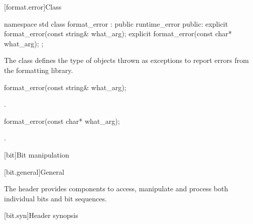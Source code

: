 [format.error]{Class }

%
\begin{codeblock}
namespace std {
  class format_error : public runtime_error {
  public:
    explicit format_error(const string& what_arg);
    explicit format_error(const char* what_arg);
  };
}
\end{codeblock}

\pnum
The class  defines the type of objects thrown as
exceptions to report errors from the formatting library.

%
\begin{itemdecl}
format_error(const string& what_arg);
\end{itemdecl}

\begin{itemdescr}
\pnum
\ensures
{}.

%
\end{itemdescr}
\begin{itemdecl}
format_error(const char* what_arg);
\end{itemdecl}

\begin{itemdescr}
\pnum
\ensures
{}.
\end{itemdescr}

[bit]{Bit manipulation}

[bit.general]{General}

\pnum
The header  provides components to access,
manipulate and process both individual bits and bit sequences.

[bit.syn]{Header  synopsis}


